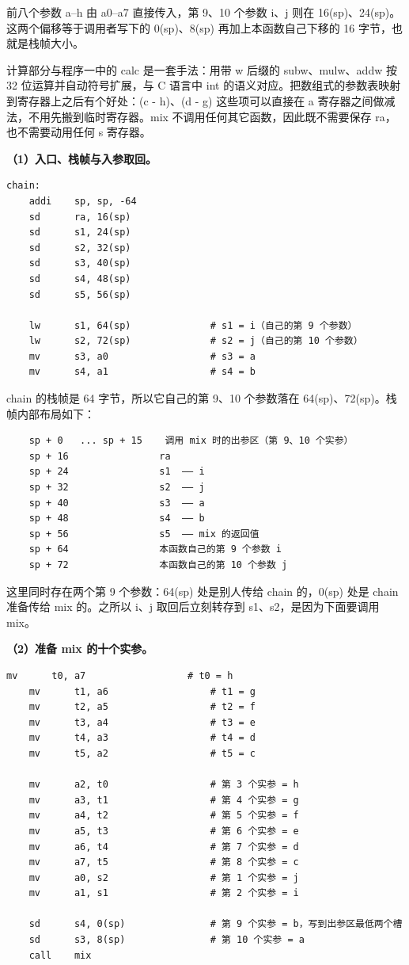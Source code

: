 \documentclass[UTF8,a4paper,10pt]{ctexart}
\newcommand{\hfour}[1]{\par\vspace{0.55em}\noindent{\bfseries #1}\par\vspace{0.25em}}
\begin{document}
前八个参数 a–h 由 a0–a7 直接传入，第 9、10 个参数 i、j 则在 16(sp)、24(sp)。这两个偏移等于调用者写下的 0(sp)、8(sp) 再加上本函数自己下移的 16 字节，也就是栈帧大小。

计算部分与程序一中的 calc 是一套手法：用带 w 后缀的 subw、mulw、addw 按 32 位运算并自动符号扩展，与 C 语言中 int 的语义对应。把数组式的参数表映射到寄存器上之后有个好处：(c - h)、(d - g) 这些项可以直接在 a 寄存器之间做减法，不用先搬到临时寄存器。mix 不调用任何其它函数，因此既不需要保存 ra，也不需要动用任何 s 寄存器。

\hfour{2. 函数 chain}

\textbf{（1）入口、栈帧与入参取回。}

\begin{lstlisting}[language=riscv]
chain:
    addi    sp, sp, -64
    sd      ra, 16(sp)
    sd      s1, 24(sp)
    sd      s2, 32(sp)
    sd      s3, 40(sp)
    sd      s4, 48(sp)
    sd      s5, 56(sp)

    lw      s1, 64(sp)              # s1 = i（自己的第 9 个参数）
    lw      s2, 72(sp)              # s2 = j（自己的第 10 个参数）
    mv      s3, a0                  # s3 = a
    mv      s4, a1                  # s4 = b
\end{lstlisting}

chain 的栈帧是 64 字节，所以它自己的第 9、10 个参数落在 64(sp)、72(sp)。栈帧内部布局如下：

\begin{lstlisting}
    sp + 0   ... sp + 15    调用 mix 时的出参区（第 9、10 个实参）
    sp + 16                ra
    sp + 24                s1  —— i
    sp + 32                s2  —— j
    sp + 40                s3  —— a
    sp + 48                s4  —— b
    sp + 56                s5  —— mix 的返回值
    sp + 64                本函数自己的第 9 个参数 i
    sp + 72                本函数自己的第 10 个参数 j
\end{lstlisting}

这里同时存在两个第 9 个参数：64(sp) 处是别人传给 chain 的，0(sp) 处是 chain 准备传给 mix 的。之所以 i、j 取回后立刻转存到 s1、s2，是因为下面要调用 mix。

\textbf{（2）准备 mix 的十个实参。}

\begin{lstlisting}[language=riscv]
    mv      t0, a7                  # t0 = h
    mv      t1, a6                  # t1 = g
    mv      t2, a5                  # t2 = f
    mv      t3, a4                  # t3 = e
    mv      t4, a3                  # t4 = d
    mv      t5, a2                  # t5 = c

    mv      a2, t0                  # 第 3 个实参 = h
    mv      a3, t1                  # 第 4 个实参 = g
    mv      a4, t2                  # 第 5 个实参 = f
    mv      a5, t3                  # 第 6 个实参 = e
    mv      a6, t4                  # 第 7 个实参 = d
    mv      a7, t5                  # 第 8 个实参 = c
    mv      a0, s2                  # 第 1 个实参 = j
    mv      a1, s1                  # 第 2 个实参 = i

    sd      s4, 0(sp)               # 第 9 个实参 = b，写到出参区最低两个槽
    sd      s3, 8(sp)               # 第 10 个实参 = a
    call    mix
\end{lstlisting}
\end{document}
